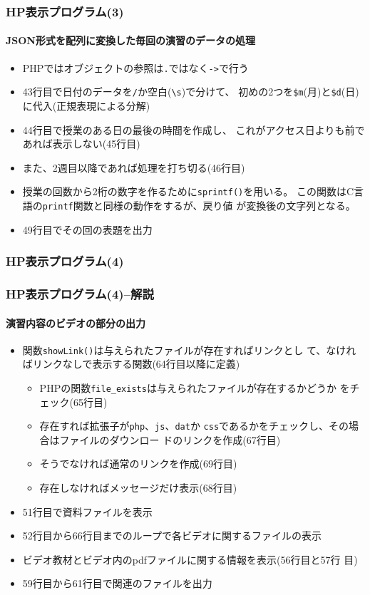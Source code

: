 \begin{frame}[containsverbatim]
 \frametitle{HP表示プログラム(3)}
 \framesubtitle{JSON形式を配列に変換した毎回の演習のデータの処理}
 \scriptsize
  \begin{itemize}
  \item PHPではオブジェクトの参照は\texttt{.}ではなく\Verb+->+で行う
  \item 43行目で日付のデータを\texttt{/}か空白(\Verb+\s+)で分けて、
        初めの2つを\Verb+$m+(月)と\Verb+$d+(日)に代入(正規表現による分解)
  \item 44行目で授業のある日の最後の時間を作成し、
        これがアクセス日よりも前であれば表示しない(45行目)
  \item また、2週目以降であれば処理を打ち切る(46行目)
  \item 授業の回数から2桁の数字を作るために\texttt{sprintf()}を用いる。
        この関数はC言語の\texttt{printf}関数と同様の動作をするが、戻り値
        が変換後の文字列となる。
  \item 49行目でその回の表題を出力
 \end{itemize}
\end{frame}
\begin{frame}[containsverbatim]
 \frametitle{HP表示プログラム(4)}
\end{frame}
\begin{frame}[containsverbatim]
 \frametitle{HP表示プログラム(4)--解説}
\framesubtitle{演習内容のビデオの部分の出力}
\begin{itemize}
 \item 関数\texttt{showLink()}は与えられたファイルが存在すればリンクとし
       て、なければリンクなしで表示する関数(64行目以降に定義)
 \begin{itemize}
 \item PHPの関数\Verb+file_exists+は与えられたファイルが存在するかどうか
       をチェック(65行目)
 \item 存在すれば拡張子が\texttt{php}、\texttt{js}、\texttt{dat}か
			 \texttt{css}であるかをチェックし、その場合はファイルのダウンロー
			 ドのリンクを作成(67行目)
	\item そうでなければ通常のリンクを作成(69行目)
 \item 存在しなければメッセージだけ表示(68行目)
\end{itemize}
\item 51行目で資料ファイルを表示
 \item 52行目から66行目までのループで各ビデオに関するファイルの表示
 \item ビデオ教材とビデオ内のpdfファイルに関する情報を表示(56行目と57行
       目)
 \item 59行目から61行目で関連のファイルを出力
\end{itemize}
\end{frame}
